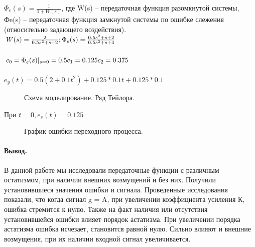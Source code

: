 \documentclass[a4paper, 11pt]{article}
\begin{document}
$\Phi_e(s)=\frac{1}{1+W(s)}$, где W(s) – передаточная функция разомкнутой системы, Фe(s) – передаточная функция замкнутой системы по ошибке слежения (относительно задающего воздействия).\\
$W(s)=\frac {2} {0.5s^2+s+2}; \\\\
\Phi_e(s)=\frac{0.5s^2+s+2}{0.5s^2+s+4}$ \\\\
$c_0=\Phi_e(s) | _{s=0} =0.5 \\  c_1=0.125 \\ c_2=0.375$ \\\\
$e_y(t)=0.5(2+0.1t^2)+0.125*0.1t+0.125*0.1$

\begin{figure}[h]
    \caption{Схема моделирование. Ряд Тейлора.}
    \label{tree}
\end{figure}

\normalsize{При $t=0, e_s(t)=0.125$}

\begin{figure}[h]
    \caption{График ошибки переходного процесса.}
    \label{tree}
\end{figure}
\newpage
\paragraph{Вывод.} В данной работе мы исследовали передаточные функции с различным остатизмом, при наличии внешних возмущений и без них. Получили установившиеся значения ошибки и сигнала. Проведенные исследования показали, что когда сигнал g = A, при увеличении коэффициента усиления К, ошибка стремится к нулю. Также на факт наличия или отсутствия установившейся ошибки влияет порядок астатизма. При увеличении порядка астатизма ошибка исчезает, становится равной нулю. Сильно влияют и внешние возмущения, при их наличии входной сигнал увеличивается.
\end{document}

